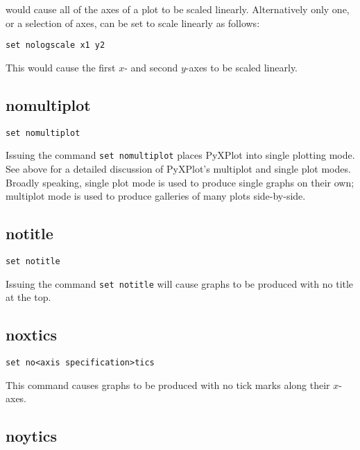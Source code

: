 \noindent would cause all of the axes of a plot to be scaled linearly. Alternatively only one,
or a selection of axes, can be set to scale linearly as follows:

\begin{verbatim}
set nologscale x1 y2
\end{verbatim}

This would cause the first $x$- and second $y$-axes to be scaled linearly.


\subsection{nomultiplot}

\begin{verbatim}
set nomultiplot
\end{verbatim}

Issuing the command {\tt set nomultiplot} places PyXPlot into single plotting
mode.  See above for a detailed discussion of PyXPlot's multiplot and
single plot modes. Broadly speaking, single plot mode is used to produce single
graphs on their own; multiplot mode is used to produce galleries of many plots
side-by-side.


\subsection{notitle}

\begin{verbatim}
set notitle
\end{verbatim}

Issuing the command {\tt set notitle} will cause graphs to be produced with no
title at the top.


\subsection{noxtics}

\begin{verbatim}
set no<axis specification>tics
\end{verbatim}

This command causes graphs to be produced with no tick marks along their $x$-axes.

\subsection{noytics}

